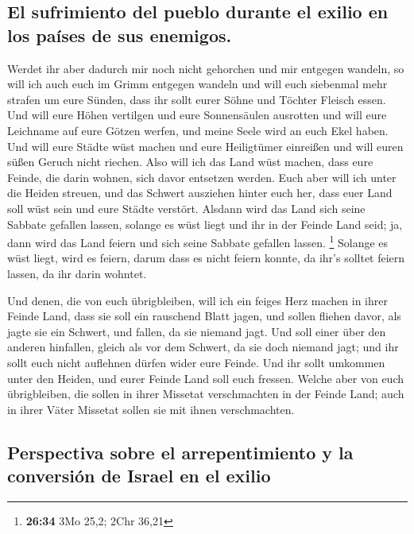 \hypertarget{el-sufrimiento-del-pueblo-durante-el-exilio-en-los-pauxedses-de-sus-enemigos.}{%
\subsection{El sufrimiento del pueblo durante el exilio en los países de
sus
enemigos.}\label{el-sufrimiento-del-pueblo-durante-el-exilio-en-los-pauxedses-de-sus-enemigos.}}

 Werdet ihr aber dadurch mir noch nicht gehorchen und mir
entgegen wandeln,  so will ich auch euch im Grimm
entgegen wandeln und will euch siebenmal mehr strafen um eure Sünden,
 dass ihr sollt eurer Söhne und Töchter Fleisch essen.
 Und will eure Höhen vertilgen und eure Sonnensäulen
ausrotten und will eure Leichname auf eure Götzen werfen, und meine
Seele wird an euch Ekel haben.  Und will eure Städte wüst
machen und eure Heiligtümer einreißen und will euren süßen Geruch nicht
riechen.  Also will ich das Land wüst machen, dass eure
Feinde, die darin wohnen, sich davor entsetzen werden. 
Euch aber will ich unter die Heiden streuen, und das Schwert ausziehen
hinter euch her, dass euer Land soll wüst sein und eure Städte verstört.
 Alsdann wird das Land sich seine Sabbate gefallen
lassen, solange es wüst liegt und ihr in der Feinde Land seid; ja, dann
wird das Land feiern und sich seine Sabbate gefallen lassen. \footnote{\textbf{26:34}
  3Mo 25,2; 2Chr 36,21}  Solange es wüst liegt, wird es
feiern, darum dass es nicht feiern konnte, da ihr's solltet feiern
lassen, da ihr darin wohntet.

 Und denen, die von euch übrigbleiben, will ich ein
feiges Herz machen in ihrer Feinde Land, dass sie soll ein rauschend
Blatt jagen, und sollen fliehen davor, als jagte sie ein Schwert, und
fallen, da sie niemand jagt.  Und soll einer über den
anderen hinfallen, gleich als vor dem Schwert, da sie doch niemand jagt;
und ihr sollt euch nicht auflehnen dürfen wider eure Feinde.
 Und ihr sollt umkommen unter den Heiden, und eurer
Feinde Land soll euch fressen.  Welche aber von euch
übrigbleiben, die sollen in ihrer Missetat verschmachten in der Feinde
Land; auch in ihrer Väter Missetat sollen sie mit ihnen verschmachten.

\hypertarget{perspectiva-sobre-el-arrepentimiento-y-la-conversiuxf3n-de-israel-en-el-exilio}{%
\subsection{Perspectiva sobre el arrepentimiento y la conversión de
Israel en el
exilio}\label{perspectiva-sobre-el-arrepentimiento-y-la-conversiuxf3n-de-israel-en-el-exilio}}

